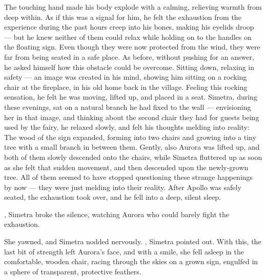 The touching hand made his body explode with a calming, relieving warmth from deep within. As if this was a signal for him, he felt the exhaustion from the experience during the past hours creep into his bones, making his eyelids droop --- but he knew neither of them could relax while holding on to the handles on the floating sign. Even though they were now protected from the wind, they were far from being seated in a safe place.
As before, without pushing for an answer, he asked himself how this obstacle could be overcome. Sitting down, relaxing in safety --- an image was created in his mind, showing him sitting on a rocking chair at the fireplace, in his old home back in the village. Feeling this rocking sensation, he felt he was moving, lifted up, and placed in a seat. Simetra, during these evenings, sat on a natural branch he had fixed to the wall --- envisioning her in that image, and thinking about the second chair they had for guests being used by the fairy, he relaxed slowly, and felt his thoughts melding into reality: The wood of the sign expanded, forming into two chairs and growing into a tiny tree with a small branch in between them. Gently, also Aurora was lifted up, and both of them slowly descended onto the chairs, while Simetra fluttered up as soon as she felt that sudden movement, and then descended upon the newly-grown tree. All of them seemed to have stopped questioning these strange happenings by now --- they were just melding into their reality. After Apollo was safely seated, the exhaustion took over, and he fell into a deep, silent sleep.

, Simetra broke the silence, watching Aurora who could barely fight the exhaustion. 


She yawned, and Simetra nodded nervously. , Simetra pointed out. With this, the last bit of strength left Aurora's face, and with a smile, she fell asleep in the comfortable, wooden chair, racing through the skies on a grown sign, engulfed in a sphere of transparent, protective feathers.

